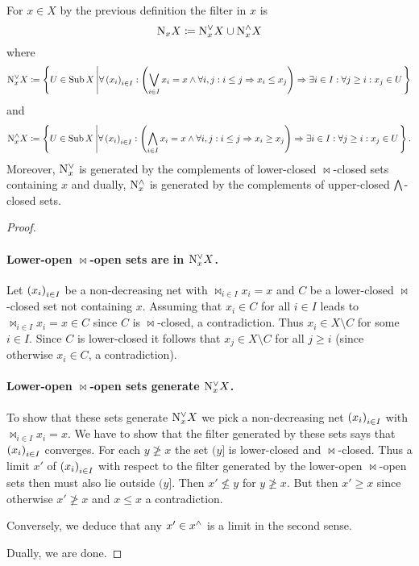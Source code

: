 \documentclass[8pt,a4paper]{article}
\begin{document}
\begin{lemma}
    For $x\in X$ by the previous definition the filter in $x$ is
    $$
    \mathrm{N}_x X\mathrel{\mathrel{\mathop:}\mkern-1.2mu=} \mathrm{N}^{\vee}_x X\cup \mathrm{N}^{\wedge}_x X$$
    where
    $$
    \N^{\join}_x X\defeq
    \set{U\in\Sub X}[\forall\seq{x_i}_{i\in I}:\left(\Join_{i\in I}{x_i}=x\lgand \forall i,j:i\leq j\implies x_i\leq x_j\right)\implies\exists i\in I:\forall j\geq i:x_j\in U]
    $$
    and
    $$
    \N^{\meet}_x X\defeq
    \set{U\in\Sub X}[\forall\seq{x_i}_{i\in I}:\left(\Meet_{i\in I}{x_i}=x\lgand \forall i,j:i\leq j\implies x_i\geq x_j\right)\implies\exists i\in I:\forall j\geq i:x_j\in U].
    $$
    Moreover, $\mathrm{N}^{\vee}_x$ is generated by the complements of lower-closed $\Join$-closed sets containing $x$ and dually, $\mathrm{N}^{\wedge}_x$ is generated by the complements of upper-closed $\mathop\mathrm{\bigwedge}$-closed sets. 
\end{lemma}

\begin{proof}
    \paragraph{Lower-open $\Join$-open sets are in $\mathrm{N}^{\vee}_x X$.}
    Let $\seq{x_i}_{i\in I}$ be a non-decreasing net with $\Join_{i\in I}{x_i}=x$ and $C$ be a lower-closed $\Join$-closed set not containing $x$. Assuming that $x_i\in C$ for all $i\in I$ leads to $\Join_{i\in I}{x_i}=x\in C$ since $C$ is $\Join$-closed, a contradiction. Thus $x_i\in X\setminus C$ for some $i\in I$. Since $C$ is lower-closed it follows that $x_j\in X\setminus C$ for all $j\geq i$ (since otherwise $x_i\in C$, a contradiction).

    \paragraph{Lower-open $\Join$-open sets generate $\mathrm{N}^{\vee}_x X$.}
    To show that these sets generate $\mathrm{N}^{\vee}_x X$ we pick a non-decreasing net $\seq{x_i}_{i\in I}$ with $\Join_{i\in I}{x_i}=x$. We have to show that the filter generated by these sets says that $\seq{x_i}_{i\in I}$ converges. For each $y\not\geq x$ the set $(y]$ is lower-closed and $\Join$-closed. Thus a limit $x'$ of $\seq{x_i}_{i\in I}$ with respect to the filter generated by the lower-open $\Join$-open sets then must also lie outside $(y]$. Then $x'\not\leq y$ for $y\not\geq x$.
But then $x'\geq x$ since otherwise $x'\not\geq x$ and $x\leq x$ a contradiction.

Conversely, we deduce that any $x'\in x^{\wedge}$ is a limit in the second sense.

Dually, we are done.
\end{proof}
\end{document}
